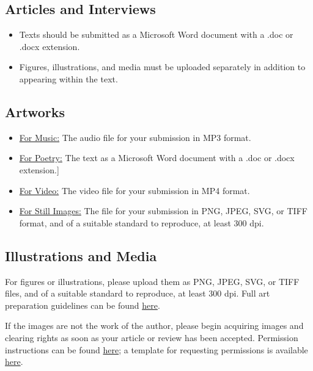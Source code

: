 \documentclass[12pt]{article}
\begin{document}
\subsection{Articles and Interviews}

\begin{itemize}[noitemsep]
\item Texts should be submitted as a Microsoft Word document with a .doc or .docx extension. 
\item Figures, illustrations, and media must be uploaded separately in addition to appearing within the text.
\end{itemize}

\subsection*{Artworks}

\begin{itemize}[noitemsep]
\item \uline{For Music:} The audio file for your submission in MP3 format.
\item \uline{For Poetry:} The text as a Microsoft Word document with a .doc or .docx extension.]
\item \uline{For Video:} The video file for your submission in MP4 format.
\item \uline{For Still Images:} The file for your submission in PNG, JPEG, SVG, or TIFF format, and of a suitable standard to reproduce, at least 300 dpi.
\end{itemize}

\subsection{Illustrations and Media}

For figures or illustrations, please upload them as PNG, JPEG, SVG, or TIFF files, and of a suitable standard to reproduce, at least 300 dpi. Full art preparation guidelines can be found \href{https://drive.google.com/file/d/1XBrYgYhOPmB3yAnfSL3PqGKXPNw0NAFE/view}{here}.

If the images are not the work of the author, please begin acquiring images and clearing rights as soon as your article or review has been accepted. Permission instructions can be found \href{https://drive.google.com/file/d/1TJF59MuoX3erJv5WXY6jg1Uh0hZzYU6N/view}{here}; a template for requesting permissions is available \href{https://drive.google.com/file/d/1MJ9yFqoR7GNSpBaNPJLexXKvkF4yifzR/view}{here}.
\end{document}

